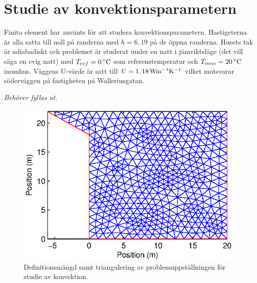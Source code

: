 \section{Studie av konvektionsparametern}

Finita element har använts för att studera konvektionsparametern. Hastigeterna är alla
satta till noll på randerna med $h=6,19$ på de öppna randerna. Husets tak är adiabadiskt
och problemet är studerat under en natt i jämviktsläge (det vill säga en evig natt) med
$T_{ref} = \unit[0]{^\circ C}$ som referenstemperatur och $T_{inne} = \unit[20]{^\circ C}$ inomhus.
Väggens U-värde är satt till $U = \unit[1,18]{Wm^{-1}K^{-1}}$ vilket motsvarar söderväggen på fastigheten på Walleriusgatan.

\emph{\color{red} Behöver fyllas ut.}

\begin{figure}
\centering
\includegraphics{images/triconvec.eps}
\caption{Definitionsmängd samt triangulering av problemuppställningen för studie av konvektion.}
\end{figure}
